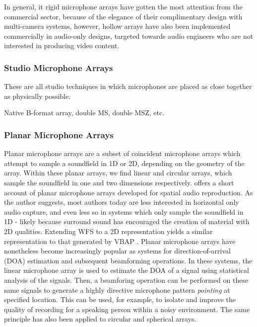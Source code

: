 In general, it rigid microphone arrays have gotten the most attention from the commercial sector, because of the elegance of their complimentary design with multi-camera systems, however, hollow arrays have also been implemented commercially in audio-only designs, targeted towards audio engineers who are not interested in producing video content. 

\subsubsection{Studio Microphone Arrays}
These are all studio techniques in which microphones are placed as close together as physically possible. 

Native B-format array, double MS, double MSZ, etc.

\subsubsection{Planar Microphone Arrays}

Planar microphone arrays are a subset of coincident microphone arrays which attempt to sample a soundfield in 1D or 2D, depending on the geometry of the array. Within these planar arrays, we find linear and circular arrays, which sample the soundfield in one and two dimensions respectively. \cite{zhang2017surround} offers a short account of planar microphone arrays developed for spatial audio reproduction. As the author suggests, most authors today are less interested in horizontal only audio capture, and even less so in systems which only sample the soundfield in 1D - likely because surround sound has encouraged the creation of material with 2D qualities. Extending WFS to a 2D representation yields a similar representation to that generated by VBAP \cite{smith2019spatial}. 
Planar microphone arrays have nonetheless become increasingly popular as systems for direction-of-arrival (DOA) estimation and subsequent beamforming operations. In these systems, the linear microphone array is used to estimate the DOA of a signal using statistical analysis of the signals. Then, a beamforing operation can be performed on these same signals to generate a highly directive microphone pattern \textit{pointing} at specified location. This can be used, for example, to isolate and improve the quality of recording for a speaking person within a noisy environment. The same principle has also been applied to circular and spherical arrays. 

